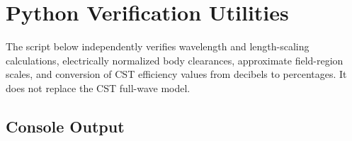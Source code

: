 \chapter{Python Verification Utilities}
\label{app:python-utility-calculations}

The script below independently verifies wavelength and length-scaling calculations, electrically normalized body clearances, approximate field-region scales, and conversion of CST efficiency values from decibels to percentages. It does not replace the CST full-wave model.



\section{Console Output}

